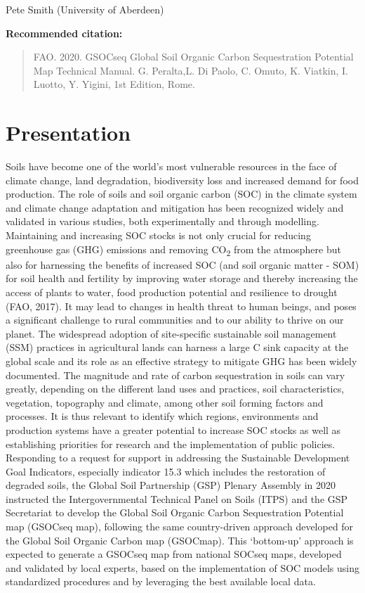 \documentclass[
  10pt,
  b5paper,
]{book}
\begin{document}
Pete Smith (University of Aberdeen)

\vfill

\textbf{Recommended citation:}

\begin{quote}
FAO. 2020. GSOCseq Global Soil Organic Carbon Sequestration Potential Map
Technical Manual. G. Peralta,L. Di Paolo, C. Omuto, K. Viatkin, I. Luotto, Y. Yigini, 1st Edition, Rome.
\end{quote}

\hypertarget{presentation}{%
\chapter{\textbar{} Presentation}\label{presentation}}

Soils have become one of the world's most vulnerable resources in the face of climate change, land degradation, biodiversity loss and increased demand for food production. The role of soils and soil organic carbon (SOC) in the climate system and climate change adaptation and mitigation has been recognized widely and validated in various studies, both experimentally and through modelling. Maintaining and increasing SOC stocks is not only crucial for reducing greenhouse gas (GHG) emissions and removing CO\textsubscript{2} from the atmosphere but also for harnessing the benefits of increased SOC (and soil organic matter - SOM) for soil health and fertility by improving water storage and thereby increasing the access of plants to water, food production potential and resilience to drought (FAO, 2017). It may lead to changes in health threat to human beings, and poses a significant challenge to rural communities and to our ability to thrive on our planet. The widespread adoption of site-specific sustainable soil management (SSM) practices in agricultural lands can harness a large C sink capacity at the global scale and its role as an effective strategy to mitigate GHG has been widely documented.
The magnitude and rate of carbon sequestration in soils can vary greatly, depending on the different land uses and practices, soil characteristics, vegetation, topography and climate, among other soil forming factors and processes. It is thus relevant to identify which regions, environments and production systems have a greater potential to increase SOC stocks as well as establishing priorities for research and the implementation of public policies.
Responding to a request for support in addressing the Sustainable Development Goal Indicators, especially indicator 15.3 which includes the restoration of degraded soils, the Global Soil Partnership (GSP) Plenary Assembly in 2020 instructed the Intergovernmental Technical Panel on Soils (ITPS) and the GSP Secretariat to develop the Global Soil Organic Carbon Sequestration Potential map (GSOCseq map), following the same country-driven approach developed for the Global Soil Organic Carbon map (GSOCmap). This `bottom-up' approach is expected to generate a GSOCseq map from national SOCseq maps, developed and validated by local experts, based on the implementation of SOC models using standardized procedures and by leveraging the best available local data.
\end{document}
